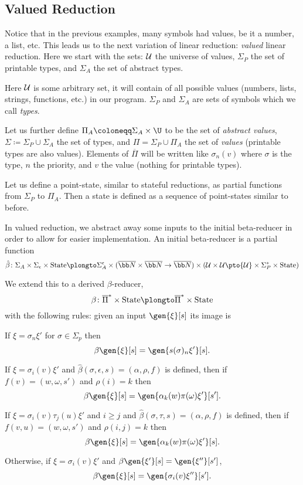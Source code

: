 \subsection{Valued Reduction}

Notice that in the previous examples, many symbols had values, be it a number, a list, etc.
This leads us to the next variation of linear reduction: {\it valued} linear reduction.
Here we start with the sets: ${\cal U}$ the universe of values, $\Sigma_P$ the set of printable types, and $\Sigma_A$ the set of abstract types.

Here ${\cal U}$ is some arbitrary set, it will contain of all possible values (numbers, lists, strings, functions, etc.) in our program.
$\Sigma_P$ and $\Sigma_A$ are sets of symbols which we call {\it types}.

Let us further define $\Pi_A\coloneqq\Sigma_A\times\U$ to be the set of {\it abstract values}, $\Sigma\coloneqq\Sigma_P\cup\Sigma_A$ the set of types, and $\Pi=\Sigma_P\cup\Pi_A$ the set of {\it values}
(printable types are also values).
Elements of $\overline\Pi$ will be written like $\sigma_n(v)$ where $\sigma$ is the type, $n$ the priority, and $v$ the value (nothing for printable types).

Let us define a point-state, similar to stateful reductions, as partial functions from $\Sigma_P$ to $\Pi_A$.
Then a state is defined as a sequence of point-states similar to before.

In valued reduction, we abstract away some inputs to the initial beta-reducer in order to allow for easier implementation.
An initial beta-reducer is a partial function
$$ \hat\beta\colon \Sigma_A\times\Sigma_\epsilon\times{\rm State}\plongto\Sigma_A^\epsilon\times(\overline{\bb N}\times\overline{\bb N}\to\overline{\bb N})\times
({\cal U}\times{\cal U}\pto{\cal U}\times\Sigma_P^*\times{\rm State}) $$

We extend this to a derived $\beta$-reducer,
$$ \beta\colon\overline\Pi^*\times{\rm State}\plongto\overline\Pi^*\times{\rm State} $$
with the following rules: given an input $\gen{\xi}[s]$ its image is
\benum
    \item If $\xi=\sigma_n\xi'$ for $\sigma\in\Sigma_p$ then
        $$ \beta\gen{\xi}[s] = \gen{s(\sigma)_n\xi'}[s] . $$
    \item If $\xi=\sigma_i(v)\xi'$ and $\hat\beta(\sigma,\epsilon,s)=(\alpha,\rho,f)$ is defined, then if $f(v)=(w,\omega,s')$ and $\rho(i)=k$ then
        $$ \beta\gen{\xi}[s] = \gen{\alpha_k(w)\pi(\omega)\xi'}[s'] . $$
    \item If $\xi=\sigma_i(v)\tau_j(u)\xi'$ and $i\geq j$ and $\hat\beta(\sigma,\tau,s)=(\alpha,\rho,f)$ is defined, then if $f(v,u)=(w,\omega,s')$ and $\rho(i,j)=k$ then
        $$ \beta\gen{\xi}[s] = \gen{\alpha_k(w)\pi(\omega)\xi'}[s] . $$
    \item Otherwise, if $\xi=\sigma_i(v)\xi'$ and $\beta\gen{\xi'}[s]=\gen{\xi''}[s']$,
        $$ \beta\gen{\xi}[s] = \gen{\sigma_i(v)\xi''}[s'] . $$
\eenum

